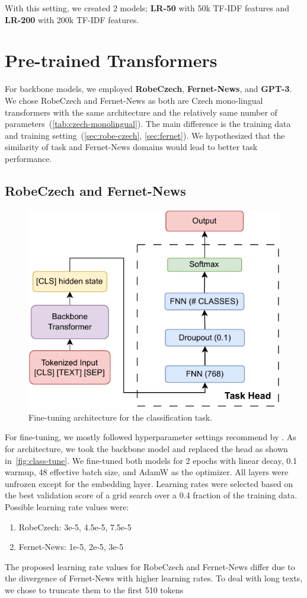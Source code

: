 With this setting, we created 2 models; \textbf{LR-50} with 50k TF-IDF features
and \textbf{LR-200} with 200k TF-IDF features.

\section{Pre-trained Transformers}
\label{sec:backbone}
For backbone models, we employed \textbf{RobeCzech}, \textbf{Fernet-News},
and \textbf{GPT-3}. We chose RobeCzech and Fernet-News as both are Czech mono-lingual transformers
with the same architecture and the relatively same number of parameters~(\autoref{tab:czech-monolingual}).
The main difference is the training data and training setting~(\autoref{sec:robe-czech}, \autoref{sec:fernet}).
We hypothesized
that the similarity of task and Fernet-News domains would lead to better task
performance.

\subsection{RobeCzech and Fernet-News}
\label{sec:base-models}

\begin{figure}[h]
    \centering
    \includegraphics[width=0.7\linewidth]{img/transformer/fine_tune.pdf}
    \caption{Fine-tuning architecture for the classification task.}
    \label{fig:class-tune}
\end{figure}

For fine-tuning, we mostly followed hyperparameter settings
recommend by \textcite{sunHowFineTuneBERT2020}.
As for architecture, we took the backbone model and replaced
the head as shown in~\autoref{fig:class-tune}.
We fine-tuned both models for 2 epochs with linear decay, 0.1 warmup, 48
effective batch size, and AdamW as the optimizer. All layers were unfrozen
except for the embedding layer. Learning rates were selected based on the best
validation score of a grid search over a 0.4 fraction of the training data. Possible
learning rate values were:
\begin{enumerate}
    \item RobeCzech: 3e-5, 4.5e-5, 7.5e-5
    \item Fernet-News: 1e-5, 2e-5, 3e-5
\end{enumerate}
The proposed learning rate values for RobeCzech and Fernet-News differ due
to the divergence of Fernet-News with higher learning rates. To deal with long
texts, we chose to truncate them to the first 510 tokens

